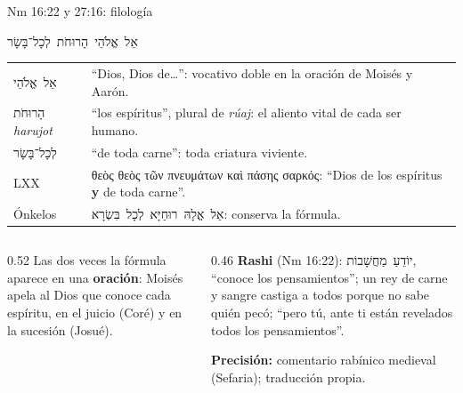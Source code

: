 \documentclass[hyperref={bookmarks=false},aspectratio=169]{beamer}
\newcommand{\heb}[1]{\mbox{\foreignlanguage{hebrew}{#1}}}
\newcommand{\grc}[1]{\foreignlanguage{ancientgreek}{#1}}
\newcommand{\destacar}[1]{\textbf{\textcolor{azul}{#1}}}
\newcommand{\precision}[1]{{\footnotesize\color{gris}\textbf{Precisión:} #1}}
\begin{document}
\begin{frame}{Nm 16:22 y 27:16: filología}
\begin{center}\heb{אֵל אֱלֹהֵי הָרוּחֹת לְכָל־בָּשָׂר}\end{center}
\scriptsize\renewcommand{\arraystretch}{1.12}
\begin{tabular}{@{}>{\RaggedRight\arraybackslash}p{2.8cm}>{\RaggedRight\arraybackslash}p{9.0cm}@{}}
\toprule
\heb{אֵל אֱלֹהֵי} & ``Dios, Dios de\ldots'': vocativo doble en la oración de Moisés y Aarón. \\
\heb{הָרוּחֹת} \emph{harujot} & ``los espíritus'', plural de \emph{rúaj}: el aliento vital de cada ser humano. \\
\heb{לְכָל־בָּשָׂר} & ``de toda carne'': toda criatura viviente. \\
LXX & \grc{θεὸς θεὸς τῶν πνευμάτων καὶ πάσης σαρκός}: ``Dios de los espíritus \destacar{y} de toda carne''. \\
Ónkelos & \heb{אֵל אֱלָהּ רוּחַיָּא לְכָל בִּשְׂרָא}: conserva la fórmula. \\
\bottomrule
\end{tabular}\par\medskip
\begin{columns}[t,onlytextwidth]
\begin{column}{0.52\textwidth}\small
Las dos veces la fórmula aparece en una \destacar{oración}: Moisés apela al Dios que conoce cada espíritu, en el juicio (Coré) y en la sucesión (Josué).
\end{column}
\begin{column}{0.46\textwidth}\scriptsize
\textbf{Rashi} (Nm 16:22): \heb{יוֹדֵעַ מַחֲשָׁבוֹת}, ``conoce los pensamientos''; un rey de carne y sangre castiga a todos porque no sabe quién pecó; ``pero tú, ante ti están revelados todos los pensamientos''.\par\smallskip
\precision{comentario rabínico medieval (Sefaria); traducción propia.}
\end{column}
\end{columns}
\end{frame}
\end{document}
